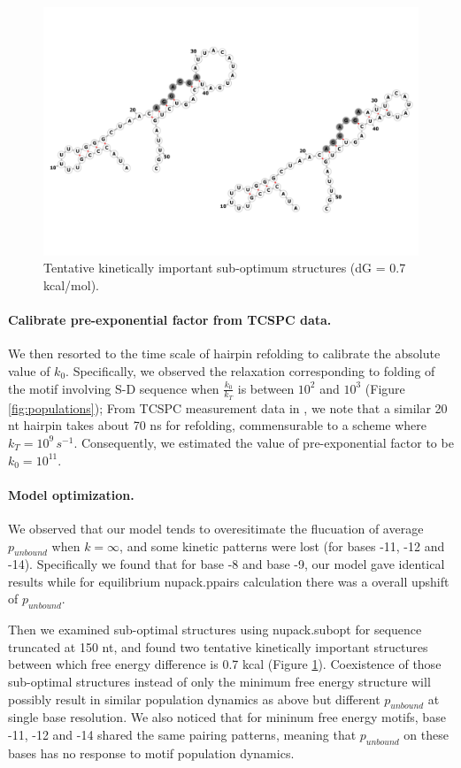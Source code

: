 \documentclass[11pt, a4paper]{article}
\begin{document}
\begin{figure}
\centering
\includegraphics[width=\linewidth]{folding_example_grey_compare.png}
\caption{Tentative kinetically important sub-optimum structures (dG = 0.7 kcal/mol).}
\label{fig:excp}
\end{figure}

\paragraph{Calibrate pre-exponential factor from TCSPC data.} We then resorted to the time scale of hairpin refolding to calibrate the absolute value of $k_0$. Specifically, we observed the relaxation corresponding to folding of the motif involving S-D sequence when $\frac{k_0}{k_T}$ is between $10^2$ and $10^3$ (Figure \ref{fig:populations});
 From TCSPC measurement data in \cite{}, we note that a similar 20 nt hairpin takes about 70 ns for refolding, commensurable to a scheme where $k_T=10^{9}\, s^{-1}$. Consequently, we estimated the value of pre-exponential factor to be $k_0=10^{11}$.

 \paragraph{Model optimization.} We observed that our model tends to overesitimate the flucuation of average $p_{unbound}$ when $k=\infty$, and some kinetic patterns were lost (for bases -11, -12 and -14). Specifically we found that for base -8 and base -9, our model gave identical results while for equilibrium nupack.ppairs calculation there was a overall upshift of $p_{unbound}$.

 Then we examined sub-optimal structures using nupack.subopt for sequence truncated at 150 nt, and found two tentative kinetically important structures between which free energy difference is 0.7 kcal (Figure \ref{fig:excp}). Coexistence of those sub-optimal structures instead of only the minimum free energy structure will possibly result in similar population dynamics as above but different $p_{unbound}$ at single base resolution. We also noticed that for mininum free energy motifs, base -11, -12 and -14 shared the same pairing patterns, meaning that $p_{unbound}$ on these bases has no response to motif population dynamics.
\end{document}
